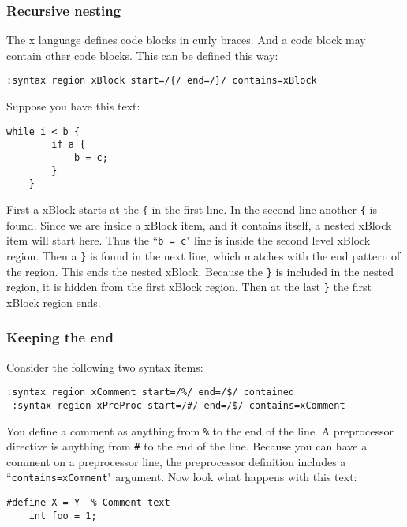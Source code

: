 \subsubsection{Recursive nesting}
The x language defines code blocks in curly braces.
And a code block may contain other code blocks.
This can be defined this way:

\begin{Verbatim}[samepage=true]
 :syntax region xBlock start=/{/ end=/}/ contains=xBlock
\end{Verbatim}

Suppose you have this text:

\begin{Verbatim}[samepage=true]
    while i < b { 
        if a { 
            b = c; 
        } 
    } 
\end{Verbatim}

First a xBlock starts at the \texttt{\{} in the first line.
In the second line another \texttt{\{} is found.
Since we are inside a xBlock item, and it contains itself, a nested xBlock item will start here.
Thus the ``\texttt{b = c}" line is inside the second level xBlock region.
Then a \texttt{\}} is found in the next line, which matches with the end pattern of the region.
This ends the nested xBlock.
Because the \texttt{\}} is included in the nested region, it is hidden from the first xBlock region.
Then at the last \texttt{\}} the first xBlock region ends.

\subsubsection{Keeping the end}
Consider the following two syntax items:

\begin{Verbatim}[samepage=true]
 :syntax region xComment start=/%/ end=/$/ contained
 :syntax region xPreProc start=/#/ end=/$/ contains=xComment
\end{Verbatim}

You define a comment as anything from \texttt{\%} to the end of the line.
A preprocessor directive is anything from \texttt{\#} to the end of the line.
Because you can have a comment on a preprocessor line, the preprocessor definition includes a ``\texttt{contains=xComment}" argument.
Now look what happens with this text:

\begin{Verbatim}[samepage=true]
    #define X = Y  % Comment text 
    int foo = 1; 
\end{Verbatim}


